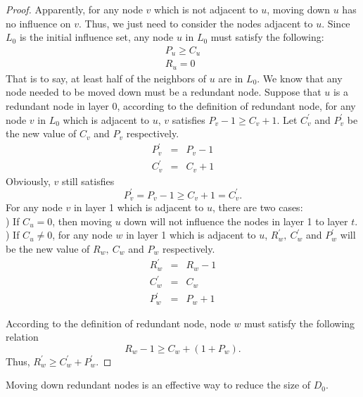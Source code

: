 \begin{proof}
	Apparently, for any node $v$ which is not adjacent to $u$, moving down $u$ has no influence on $v$. Thus, we just need to consider the nodes adjacent to $u$.
	Since $L_0$ is the initial influence set, any node $u$ in $L_0$ must satisfy the following:
	\begin{eqnarray}
	P_u \geqslant C_u\\
	R_u=0
	\end{eqnarray}
	That is to say, at least half of the neighbors of $u$ are in $L_0$.
%	
	We know that any node needed to be moved down must be a redundant node. Suppose that $u$ is a redundant node in layer 0, according to the definition of redundant node, for any node $v$ in $L_0$ which is adjacent to $u$, $v$ satisfies $P_v-1 \geqslant C_v+1$. Let $C^{'}_v$ and $P^{'}_v$ be the new value of $C_v$ and $P_v$ respectively.
%	
	\begin{eqnarray}
	P^{'}_v&=& P_v-1\\
	C^{'}_v&=& C_v+1
	\end{eqnarray}
	Obviously, $v$ still satisfies
	\[ P^{'}_v=P_v-1\geqslant C_v+1=C^{'}_v .\]
	For any node $v$ in layer 1 which is adjacent to $u$, there are two cases:\\
	) If $C_u=0$, then moving $u$ down will not influence the nodes in layer 1 to layer $t$.\\
	) If $C_u \neq 0$, for any node $w$ in layer 1 which is adjacent to $u$, $R^{'}_w,~C^{'}_w$ and $P^{'}_w$ will be the new value of $R_w,~C_w$ and $P_w$ respectively.
%	
	\begin{eqnarray}
	R^{'}_w&=& R_w-1\\
	C^{'}_w&=& C_w\\
	P^{'}_w&=& P_w+1
	\end{eqnarray}
	
	According to the definition of redundant node, node $w$ must satisfy the following relation
	\begin{equation}
	R_w-1\geqslant C_w+(1+P_w).
	\end{equation}
	Thus, $R^{'}_w \geqslant C^{'}_w+P^{'}_w$.
\end{proof}

Moving down redundant nodes is an effective way to reduce the size of $D_0$.

